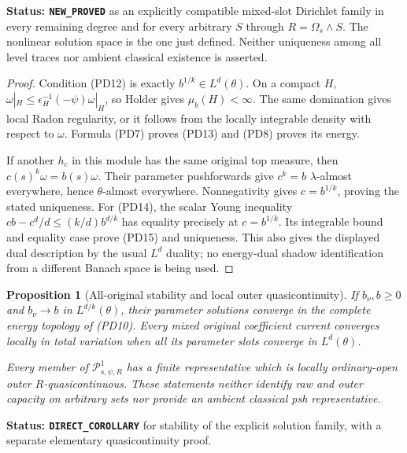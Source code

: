 \documentclass[11pt,a4paper]{article}
\numberwithin{equation}{section}
\newtheorem{proposition}[theorem]{Proposition}
\theoremstyle{definition}
\theoremstyle{remark}
\begin{document}
\noindent\textbf{Status: \texttt{NEW\_PROVED}} as an
explicitly compatible mixed-slot Dirichlet family in
every remaining degree and for every arbitrary $S$
through $R=\Omega_s\wedge S$. The nonlinear solution
space is the one just defined. Neither uniqueness
among all level traces nor ambient classical existence
is asserted.

\begin{proof}
Condition (PD12) is exactly
$b^{1/k}\in L^d(\theta)$. On a compact $H$,
$\omega|_H\leq\epsilon_H^{-1}(-\psi)\omega|_H$,
so Holder gives $\mu_b(H)<\infty$. The same domination
gives local Radon regularity, or it follows from the
locally integrable density with respect to $\omega$.
Formula (PD7) proves (PD13) and (PD8) proves its energy.

If another $h_c$ in this module has the same original
top measure, then
$c(s)^k\omega=b(s)\omega$. Their parameter pushforwards
give $c^k=b$ $\lambda$-almost everywhere, hence
$\theta$-almost everywhere. Nonnegativity gives
$c=b^{1/k}$, proving the stated uniqueness.
For (PD14), the scalar Young inequality
$cb-c^d/d\leq(k/d)b^{d/k}$ has equality precisely
at $c=b^{1/k}$. Its integrable bound and equality
case prove (PD15) and uniqueness. This also gives
the displayed dual description by the usual
$L^d$ duality; no energy-dual shadow identification
from a different Banach space is being used.
\end{proof}

\begin{proposition}[All-original stability and local outer quasicontinuity]
\label{prop:r12-parameter-source-stability}
If $b_\nu,b\geq0$ and
$b_\nu\to b$ in $L^{d/k}(\theta)$, their parameter
solutions converge in the complete energy topology
of (PD10). Every mixed original coefficient current
converges locally in total variation when all its
parameter slots converge in $L^d(\theta)$.

Every member of $\mathscr P^1_{s,\psi,R}$ has a finite
representative which is locally ordinary-open outer
$R$-quasicontinuous. These statements neither identify
raw and outer capacity on arbitrary sets nor provide
an ambient classical psh representative.
\end{proposition}

\noindent\textbf{Status: \texttt{DIRECT\_COROLLARY}}
for stability of the explicit solution family, with
a separate elementary quasicontinuity proof.
\end{document}
